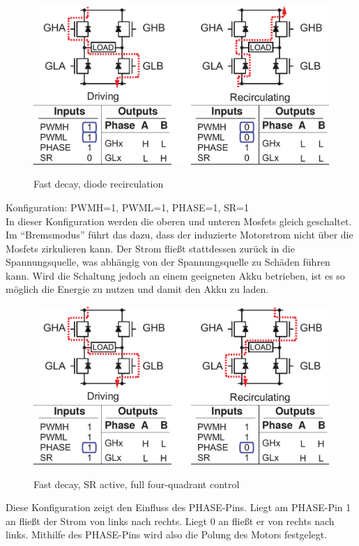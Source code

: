 \begin{figure}[H]
\centering
\includegraphics[width=.8\textwidth]{3941_4.png}\\
\caption{Fast decay, diode recirculation \cite{ds-A3941}}%
\label{fig:39414}
\end{figure}


Konfiguration: PWMH=1, PWML=1, PHASE=1, SR=1\\
In dieser Konfiguration werden die oberen und unteren Mosfets gleich geschaltet. Im
``Bremsmodus'' führt das dazu, dass der induzierte Motorstrom nicht über die Mosfets
zirkulieren kann. Der Strom fließt stattdessen zurück in die Spannungsquelle, was
abhängig von der Spannungsquelle zu Schäden führen kann. Wird die Schaltung jedoch an
einem geeigneten Akku betrieben, ist es so möglich die Energie zu nutzen und damit den Akku
zu laden.

\begin{figure}[H]
\centering
\includegraphics[width=.8\textwidth]{3941_5.png}\\
\caption{Fast decay, SR active, full four-quadrant control \cite{ds-A3941}}%
\label{fig:39415}
\end{figure}

Diese Konfiguration zeigt den Einfluss des PHASE-Pins. Liegt am PHASE-Pin 1 an
fließt der Strom von links nach rechts. Liegt 0 an fließt er von rechts nach links.
Mithilfe des PHASE-Pins wird also die Polung des Motors festgelegt.


